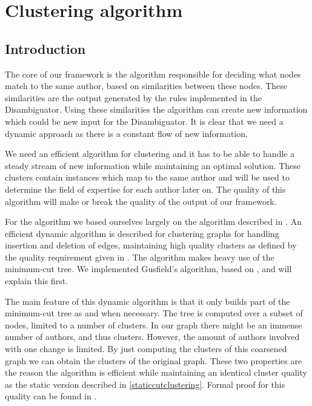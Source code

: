 \section{Clustering algorithm}

\subsection{Introduction}

The core of our framework is the algorithm responsible for deciding what nodes match to the same author, based on similarities between these nodes. These similarities are the output generated by the rules implemented in the Disambiguator. Using these similarities the algorithm can create new information which could be new input for the Disambiguator. It is clear that we need a dynamic approach as there is a constant flow of new information.

We need an efficient algorithm for clustering and it has to be able to handle a steady stream of new information while maintaining an optimal solution. These clusters contain instances which map to the same author and will be used to determine the field of expertise for each author later on. The quality of this algorithm will make or break the quality of the output of our framework.

For the algorithm we based ourselves largely on the algorithm described in \cite{saha2006dynamic}. An efficient dynamic algorithm is described for clustering graphs for handling insertion and deletion of edges, maintaining high quality clusters as defined by the quality requirement given in \cite{flake2004graph}. The algorithm makes heavy use of the minimum-cut tree. We implemented Gusfield's algorithm, based on \cite{rodrigues2011mpi}, and will explain this first.

The main feature of this dynamic algorithm is that it only builds part of the minimum-cut tree as and when necessary. The tree is computed over a subset of nodes, limited to a number of clusters. In our graph there might be an immense number of authors, and thus clusters. However, the amount of authors involved with one change is limited. By just computing the clusters of this coarsened graph we can obtain the clusters of the original graph. These two properties are the reason the algorithm is efficient while maintaining an identical cluster quality as the static version described in \ref{staticcutclustering}. Formal proof for this quality can be found in \cite{saha2006dynamic}.

